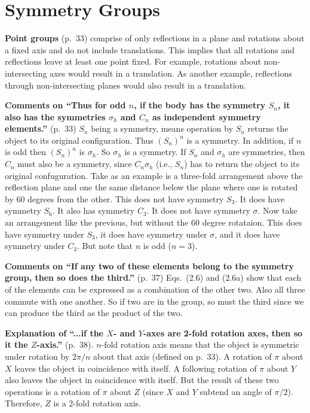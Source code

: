 \chapter{Symmetry Groups}

{\bf Point groups} (p.\ 33) comprise of only reflections in a plane and
rotations about a fixed axis and do not include translations. This
implies that all rotations and reflections leave at least one point
fixed. For example, rotations about non-intersecting axes would result
in a translation. As another example, reflections through
non-intersecting planes would also result in a translation.

{\bf Comments on ``Thus for odd $n$, if the body has the symmetry
  $S_n$, it also has the symmetries $\sigma_h$ and $C_n$ as
  independent symmetry elements.''} (p.\ 33) $S_n$ being a symmetry,
means operation by $S_n$ returns the object to its original
configuration. Thus $(S_n)^n$ is a symmetry. In addition, if $n$ is
odd then $(S_n)^n$ is $\sigma_h$. So $\sigma_h$ is a symmetry. If
$S_n$ and $\sigma_h$ are symmetries, then $C_n$ must also be a
symmetry, since $C_n \sigma_h$ (i.e., $S_n$) has to return the object
to its original confuguration. Take as an example is a three-fold
arrangement above the reflection plane and one the same distance below
the plane where one is rotated by 60 degrees from the other.  This
does not have symmetry $S_3$. It does have symmetry $S_6$. It also has
symmetry $C_3$. It does not have symmetry $\sigma$.  Now take an
arrangement like the previous, but without the 60 degree
rotataion. This does have symmetry under $S_3$, it does have symmetry
under $\sigma$, and it does have symmetry under $C_3$. But note that
$n$ is odd ($n = 3$).

{\bf Comments on ``If any two of these elements belong to the symmetry
  group, then so does the third.''} (p.\ 37) Eqs.\ (2.6) and (2.6a)
show that each of the elements can be expressed as a combination of
the other two. Also all three commute with one another. So if two are
in the group, so must the third since we can produce the third as the
product of the two.

{\bf Explanation of ``...if the $X$- and $Y$-axes are 2-fold rotation
  axes, then so it the $Z$-axis.''} (p.\ 38). $n$-fold rotation axis
means that the object is symmetric under rotation by $2\pi/n$ about
that axis (defined on p.\ 33).  A rotation of $\pi$ about $X$ leaves
the object in coincidence with itself. A following rotation of $\pi$
about $Y$ also leaves the object in coincidence with itself. But the
result of these two operations is a rotation of $\pi$ about $Z$ (since
$X$ and $Y$ subtend an angle of $\pi/2$). Therefore, $Z$ is a 2-fold
rotation axis.

